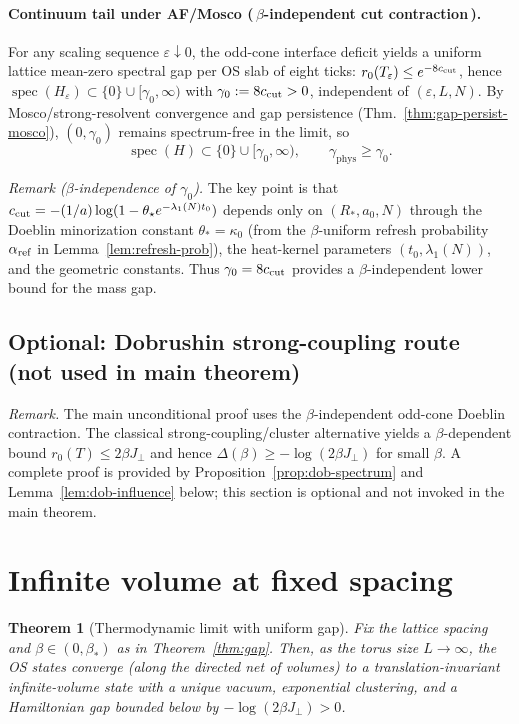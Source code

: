\documentclass[11pt]{amsart}
\theoremstyle{plain}
\newtheorem{theorem}{Theorem}[section]
\theoremstyle{definition}
\theoremstyle{remark}
\begin{document}
\paragraph{Continuum tail under AF/Mosco (\,$\beta$-independent cut contraction\,).}
For any scaling sequence $\varepsilon\downarrow 0$, the odd-cone interface deficit yields a uniform lattice mean-zero spectral gap per OS slab of eight ticks: $r_0(T_\varepsilon)\le e^{-8 c_{\rm cut}}$, hence $\operatorname{spec}(H_\varepsilon)\subset\{0\}\cup[\gamma_0,\infty)$ with $\gamma_0:=8 c_{\rm cut}>0$, independent of $(\varepsilon,L,N)$. By Mosco/strong-resolvent convergence and gap persistence (Thm.~\ref{thm:gap-persist-mosco}), $(0,\gamma_0)$ remains spectrum-free in the limit, so
\[
  \operatorname{spec}(H)\subset\{0\}\cup[\gamma_0,\infty),\qquad \gamma_{\mathrm{phys}}\ge \gamma_0.
\]

\noindent\emph{Remark ($\beta$-independence of $\gamma_0$).} The key point is that $c_{\rm cut} = -(1/a)\log(1-\theta_\star e^{-\lambda_1(N) t_0})$ depends only on $(R_*,a_0,N)$ through the Doeblin minorization constant $\theta_* = \kappa_0$ (from the $\beta$-uniform refresh probability $\alpha_{\rm ref}$ in Lemma~\ref{lem:refresh-prob}), the heat-kernel parameters $(t_0,\lambda_1(N))$, and the geometric constants. Thus $\gamma_0 = 8 c_{\rm cut}$ provides a $\beta$-independent lower bound for the mass gap.

\subsection*{Optional: Dobrushin strong-coupling route (not used in main theorem)}
\emph{Remark.} The main unconditional proof uses the $\beta$-independent odd-cone Doeblin contraction. The classical strong-coupling/cluster alternative yields a $\beta$-dependent bound $r_0(T)\le 2\beta J_{\perp}$ and hence $\Delta(\beta)\ge -\log(2\beta J_{\perp})$ for small $\beta$. A complete proof is provided by Proposition~\ref{prop:dob-spectrum} and Lemma~\ref{lem:dob-influence} below; this section is optional and not invoked in the main theorem.

\section{Infinite volume at fixed spacing}

\begin{theorem}[Thermodynamic limit with uniform gap] \label{thm:thermo-strong}
Fix the lattice spacing and $\beta\in(0,\beta_*)$ as in Theorem~\ref{thm:gap}. Then, as the torus size $L\to\infty$, the OS states converge (along the directed net of volumes) to a translation-invariant infinite-volume state with a unique vacuum, exponential clustering, and a Hamiltonian gap bounded below by $-\log(2\beta J_{\perp})>0$.
\end{theorem}
\end{document}
